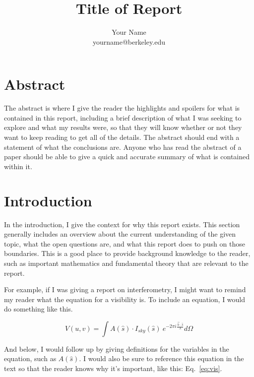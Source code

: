 \documentclass[preprint]{aastex}
\makeatletter
\newcommand{\thetitle}{Title of Report}
\newcommand{\theauthor}{Your Name}
\newcommand{\theauthorsemail}{yourname@berkeley.edu}
\newcommand{\thedate}{Month XX, 2018}
\makeatother
\begin{document}
\title{
    \sffamily\bfseries\huge
    \thetitle \\
}
\author{
    \sffamily\theauthor \\
    \sffamily\theauthorsemail
}
\maketitle
\sloppy

\section{Abstract}

The abstract is where I give the reader the highlights and spoilers for what is 
contained in this report, including a brief description of what I was seeking 
to explore and what my results were, so that they will know whether or not they 
want to keep reading to get all of the details. The abstract should end with a 
statement of what the conclusions are.  Anyone who has read the abstract of a 
paper should be able to give a quick and accurate summary of what is contained 
within it.

\section{Introduction}

In the introduction, I give the context for why this report exists. This 
section generally includes an overview about the current understanding of the 
given topic, what the open questions are, and what this report does to push on 
those boundaries. This is a good place to provide background knowledge to the 
reader, such as important mathematics and fundamental theory that are relevant 
to the report.

For example, if I was giving a report on interferometry, I might want to remind 
my reader what the equation for a visibility is. To include an equation, I 
would do something like this.

\begin{equation}
    \label{eq:vis}
    V(u,v) = \int A(\hat{s}) \cdot I_{sky}(\hat{s}) ~e^{-2 \pi i \frac{\vec{b} 
    \cdot \hat{s}}{\lambda}} d\Omega
\end{equation}

And below, I would follow up by giving definitions for the variables in the 
equation, such as $A(\hat{s})$. I would also be sure to reference this equation 
in the text so that the reader knows why it's important, like this: 
Eq.~\eqref{eq:vis}.
\end{document}
